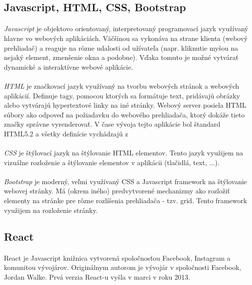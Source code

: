 \subsection{Javascript, HTML, CSS, Bootstrap}
\paragraph{}
\emph{Javascript} je objektovo orientovaný, interpretovaný programovací jazyk využívaný hlavne vo webových aplikáciách. Väčšinou sa vykonáva na strane klienta (webový prehliadač) a reaguje na rôzne udalosti od užívateľa (napr. kliknutie myšou na nejaký element, zmenšenie okna a podobne). Vďaka tomuto je možné vytvárať dynamické a interaktívne webové aplikácie.

\paragraph{}
\emph{HTML} je značkovací jazyk využívaný na tvorbu webových stránok a webových aplikácií. Definuje tagy, pomocou ktorých sa formátuje text, pridávajú obrázky alebo vytvárajú hypertextové linky na iné stránky. Webový server posiela HTML súbory ako odpoveď na požiadavku do webového prehliadača, ktorý dokáže tieto značky správne vyrenderovať. V čase vývoja tejto aplikácie bol štandard HTML5.2 a všetky definície vychádzajú z \cite{html}

\paragraph{}
\emph{CSS} je štýlovací jazyk na štýlovanie HTML elementov. Tento jazyk využijem na vizuálne rozloženie a štýlovanie elementov v aplikácii (tlačidlá, text, ...).

\paragraph{}
\emph{Bootstrap} je moderný, veľmi využívaný CSS a Javascript framework na štýlovanie webovej stránky. Má (okrem iného) predvytvorené mechanizmy ako rozložiť elementy na stránke pre rôzne rozlíšenia prehliadača - tzv. grid. Tento framework využijem na rozloženie stránky. 



\subsection{React}
\paragraph{}
React je Javascript knižnica vytvorená spoločnosťou Facebook, Instagram a komunitou vývojárov. Originálnym autorom je vývojár v spoločnosti Facebook, Jordan Walke. Prvá verzia React-u vyšla v marci v roku 2013. 
